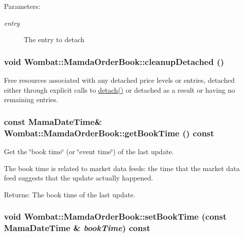 \begin{Desc}
\item[Parameters:]
\begin{description}
\item[{\em entry}]The entry to detach \end{description}
\end{Desc}
\hypertarget{classWombat_1_1MamdaOrderBook_6cce36c4642037f331c39b7a6ab0097f}{
\subsubsection[cleanupDetached]{\setlength{\rightskip}{0pt plus 5cm}void Wombat::Mamda\-Order\-Book::cleanup\-Detached ()}}
\label{classWombat_1_1MamdaOrderBook_6cce36c4642037f331c39b7a6ab0097f}


Free resources associated with any detached price levels or entries, detached either through explicit calls to \hyperlink{classWombat_1_1MamdaOrderBook_503c960afbcdea3ddae2d58812a41708}{detach()} or detached as a result or having no remaining entries. 

\hypertarget{classWombat_1_1MamdaOrderBook_c0cbfdadb732f7af3a0ee05214ddcc77}{
\subsubsection[getBookTime]{\setlength{\rightskip}{0pt plus 5cm}const Mama\-Date\-Time\& Wombat::Mamda\-Order\-Book::get\-Book\-Time () const}}
\label{classWombat_1_1MamdaOrderBook_c0cbfdadb732f7af3a0ee05214ddcc77}


Get the \char`\"{}book time\char`\"{} (or \char`\"{}event time\char`\"{}) of the last update. 

The book time is related to market data feeds: the time that the market data feed suggests that the update actually happened.

\begin{Desc}
\item[Returns:]The book time of the last update. \end{Desc}
\hypertarget{classWombat_1_1MamdaOrderBook_1607e9bd89db7e33e85733a89a5aee7b}{
\subsubsection[setBookTime]{\setlength{\rightskip}{0pt plus 5cm}void Wombat::Mamda\-Order\-Book::set\-Book\-Time (const Mama\-Date\-Time \& {\em book\-Time}) const}}
\label{classWombat_1_1MamdaOrderBook_1607e9bd89db7e33e85733a89a5aee7b}


